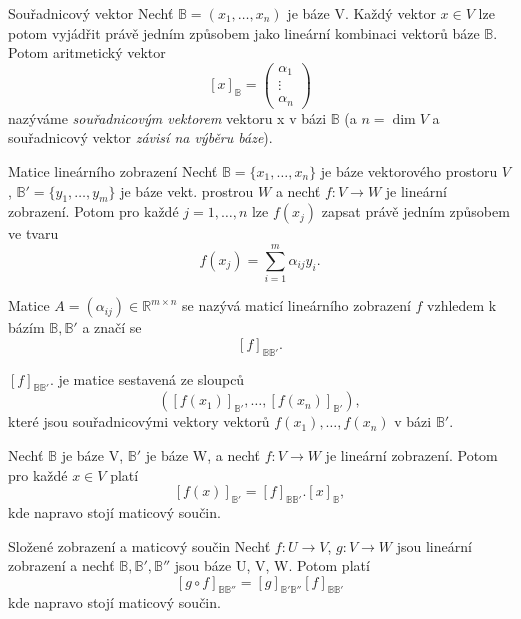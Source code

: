 \begin{definiceN}{Souřadnicový vektor}
Nechť $\mathbb{B}=(x_1,\dots,x_n)$ je báze V. Každý vektor $x \in V$ lze potom vyjádřit právě jedním způsobem jako lineární kombinaci vektorů báze $\mathbb{B}$. Potom aritmetický vektor
$$[x]_{\mathbb{B}} = \left( \begin{array}{l}\alpha_1 \\ \vdots \\ \alpha_n \end{array} \right)$$
nazýváme \emph{souřadnicovým vektorem} vektoru x v bázi $\mathbb{B}$ (a $n=\dim V$ a souřadnicový vektor \emph{závisí na výběru báze}).
\end{definiceN}


\begin{definiceN}{Matice lineárního zobrazení}
Nechť $\mathbb{B}=\{x_1, \dots, x_n\}$ je báze vektorového prostoru $V$, $\mathbb{B}'=\{y_1, \dots, y_m\}$ je báze vekt. prostrou $W$ a nechť $f: V \rightarrow W$ je lineární zobrazení. Potom pro každé $j=1, \dots, n$ lze $f(x_j)$ zapsat právě jedním způsobem ve tvaru
$$f(x_j) = \sum_{i = 1}^{m} \alpha_{ij} y_i.$$

Matice $A=(\alpha_{ij}) \in \mathbb{R}^{m \times n}$ se nazývá maticí lineárního zobrazení $f$ vzhledem k bázím $\mathbb{B}, \mathbb{B}'$ a značí se
$$[f]_{\mathbb{B}\mathbb{B}'}.$$
\end{definiceN}

\begin{pozorovani}
$[f]_{\mathbb{B}\mathbb{B}'}.$ je matice sestavená ze sloupců
$$([f(x_1)]_{\mathbb{B}'}, \dots, [f(x_n)]_{\mathbb{B}'}),$$
které jsou souřadnicovými vektory vektorů $f(x_1), \dots, f(x_n)$ v bázi $\mathbb{B}'$.
\end{pozorovani}

\begin{veta}
Nechť $\mathbb{B}$ je báze V, $\mathbb{B}'$ je báze W, a nechť $f: V \rightarrow W$ je lineární zobrazení. Potom pro každé $x \in V$ platí
$$[f(x)]_{\mathbb{B}'} = [f]_{\mathbb{B} \mathbb{B}'}.[x]_{\mathbb{B}},$$
kde napravo stojí maticový součin.
\end{veta}

\begin{vetaN}{Složené zobrazení a maticový součin}
Nechť $f: U \rightarrow V$, $g: V \rightarrow W$ jsou lineární zobrazení a nechť $\mathbb{B}, \mathbb{B}', \mathbb{B}''$ jsou báze U, V, W. Potom platí
$$[g \circ f]_{\mathbb{B} \mathbb{B}''}=[g]_{\mathbb{B}'\mathbb{B}''} [f]_{\mathbb{B}\mathbb{B}'}$$
kde napravo stojí maticový součin.
\end{vetaN}

